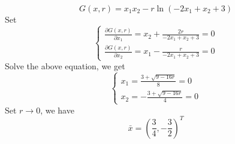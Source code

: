 \documentclass[paper=a4, fontsize=11pt]{scrartcl} %
\numberwithin{equation}{section} %
\numberwithin{figure}{section} %
\numberwithin{table}{section} %
\begin{document}
\begin{enumerate}
\begin{equation}
G(x,r)=x_1x_2-r\ln (-2x_1+x_2+3)
\end{equation}
Set 
\begin{equation} \nonumber
\left\{
\begin{aligned}
\frac{\partial G(x,r)}{\partial x_1}=x_2+\frac{2r}{-2x_1+x_2+3}=0\\
\frac{\partial G(x,r)}{\partial x_2}=x_1-\frac{r}{-2x_1+x_2+3}=0
\end{aligned}
\right.
\end{equation}
Solve the above equation, we get
\begin{equation} \nonumber
\left\{
\begin{aligned}
x_1 = \frac{3+\sqrt{9-16r}}{8}=0\\
x_2 = -\frac{3+\sqrt{9-16r}}{4}=0
\end{aligned}
\right.
\end{equation}
Set $r\rightarrow0$, we have 
\begin{equation}\nonumber
\bar{x} = (\frac{3}{4}, -\frac{3}{2})^T
\end{equation}
\end{enumerate}
\end{document}
